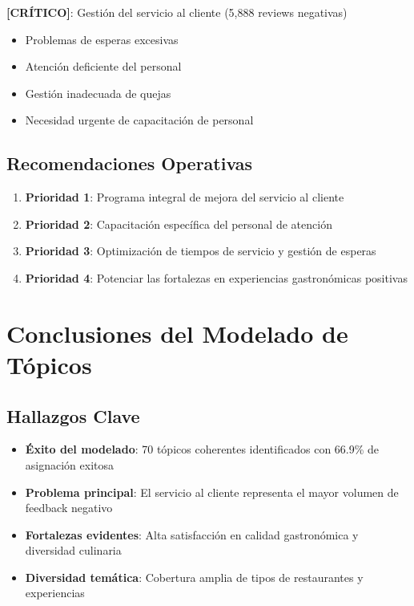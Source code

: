 \documentclass[12pt,a4paper,twoside,openany]{book}
\begin{document}
\textbf{[CRÍTICO]}: Gestión del servicio al cliente (5,888 reviews negativas)
\begin{itemize}
    \item Problemas de esperas excesivas
    \item Atención deficiente del personal
    \item Gestión inadecuada de quejas
    \item Necesidad urgente de capacitación de personal
\end{itemize}

\subsection{Recomendaciones Operativas}

\begin{enumerate}
    \item \textbf{Prioridad 1}: Programa integral de mejora del servicio al cliente
    \item \textbf{Prioridad 2}: Capacitación específica del personal de atención
    \item \textbf{Prioridad 3}: Optimización de tiempos de servicio y gestión de esperas
    \item \textbf{Prioridad 4}: Potenciar las fortalezas en experiencias gastronómicas positivas
\end{enumerate}

\section{Conclusiones del Modelado de Tópicos}

\subsection{Hallazgos Clave}

\begin{itemize}
    \item \textbf{Éxito del modelado}: 70 tópicos coherentes identificados con 66.9\% de asignación exitosa
    \item \textbf{Problema principal}: El servicio al cliente representa el mayor volumen de feedback negativo
    \item \textbf{Fortalezas evidentes}: Alta satisfacción en calidad gastronómica y diversidad culinaria
    \item \textbf{Diversidad temática}: Cobertura amplia de tipos de restaurantes y experiencias
\end{itemize}
\end{document}
